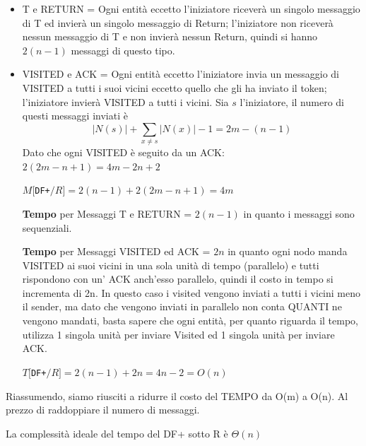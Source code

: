 \begin{itemize}
    \item T e RETURN = Ogni entità eccetto l'iniziatore riceverà un singolo
          messaggio di T ed invierà un singolo messaggio di Return; l'iniziatore non
          riceverà nessun messaggio di T e non invierà nessun Return, quindi si hanno
          $2(n-1)$ messaggi di questo tipo.

    \item VISITED e ACK = Ogni entità eccetto l'iniziatore invia un messaggio di
          VISITED a tutti i suoi vicini eccetto quello che gli ha inviato il token;
          l'iniziatore invierà VISITED a tutti i vicini. Sia $s$ l'iniziatore, il numero
          di questi messaggi inviati è
          $$|N(s)| + \sum_{x \neq s} |N(x)| - 1 = 2m - (n - 1)$$ Dato che ogni
          VISITED è seguito da un ACK: $2(2m - n + 1) = 4m -2n + 2$

          \begin{center}
              $M[$\texttt{DF+}$/R] = 2(n-1) + 2(2m-n+1) = 4m$
          \end{center}

          \textbf{Tempo} per Messaggi T e RETURN = $2(n-1)$ in quanto i messaggi
          sono sequenziali.

          \textbf{Tempo} per Messaggi VISITED ed ACK = $2n$ in quanto ogni nodo
          manda VISITED ai suoi vicini in una sola unità di tempo (parallelo) e
          tutti rispondono con un' ACK anch'esso parallelo, quindi il costo in
          tempo si incrementa di 2n. In questo caso i visited vengono inviati a
          tutti i vicini meno il sender, ma dato che vengono inviati in parallelo
          non conta QUANTI ne vengono mandati, basta sapere che ogni entità, per
          quanto riguarda il tempo, utilizza 1 singola unità per inviare Visited
          ed 1 singola unità per inviare ACK.

          \begin{center}
              $T[$\texttt{DF+}$/R] = 2(n-1) + 2n = 4n - 2 = O(n)$\\
          \end{center}
\end{itemize}

Riassumendo, siamo riusciti a ridurre il costo del TEMPO da O(m) a O(n). Al
prezzo di raddoppiare il numero di messaggi.

\begin{prop}
    La complessità ideale del tempo del DF+ sotto R è $\Theta(n)$
\end{prop}

